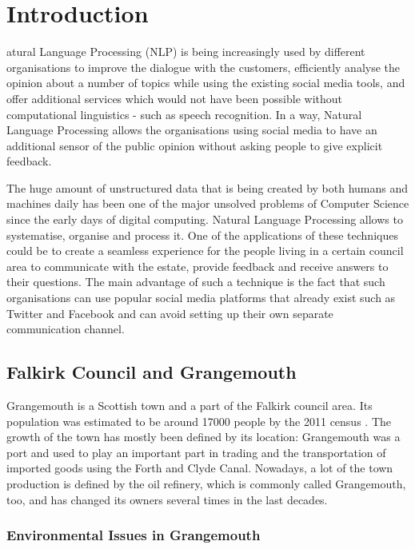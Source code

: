 \let\textcircled=\pgftextcircled
\chapter{Introduction}
\label{chap:intro}

atural Language Processing (NLP) is being increasingly used by different organisations to  improve the dialogue with the customers, efficiently analyse the opinion about a number of topics while using the existing social media tools, and offer additional services which would not have been possible without computational linguistics - such as speech recognition. In a way, Natural Language Processing allows the organisations using social media to have an additional sensor of the public opinion without asking people to give explicit feedback.

The huge amount of unstructured data that is being created by both humans and machines daily has been one of the major unsolved problems of Computer Science since the early days of digital computing. Natural Language Processing allows to systematise, organise and process it. One of the applications of these techniques could be to create a seamless experience for the people living in a certain council area to communicate with the estate, provide feedback and receive answers to their questions. The main advantage of such a technique is the fact that such organisations can use popular social media platforms that already exist such as Twitter and Facebook and can avoid setting up their own separate communication channel. 


\section{Falkirk Council and Grangemouth}
\label{sec:falkirk}

Grangemouth is a Scottish town and a part of the Falkirk council area. Its population was estimated to be around 17000 people by the 2011 census \cite{falkirkcensus}. The growth of the town has mostly been defined by its location: Grangemouth was a port and used to play an important part in trading and the transportation of imported goods using the Forth and Clyde Canal. Nowadays, a lot of the town production is defined by the oil refinery, which is commonly called Grangemouth, too, and has changed its owners several times in the last decades. 

\subsection{Environmental Issues in Grangemouth}
\label{subsec:environment}

